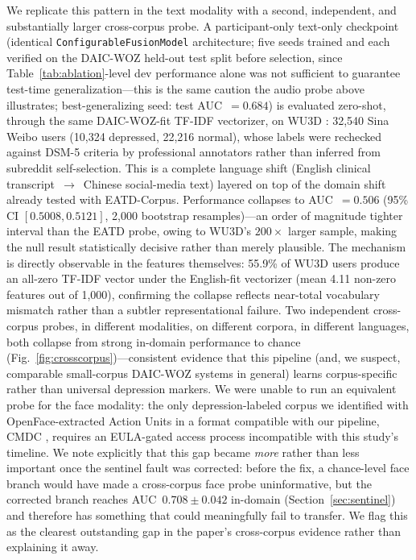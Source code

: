 \documentclass[5p,twocolumn]{elsarticle}
\begin{document}
We replicate this pattern in the text modality with a second,
independent, and substantially larger cross-corpus probe. A
participant-only text-only checkpoint (identical
\texttt{ConfigurableFusionModel} architecture; five seeds trained and
each verified on the DAIC-WOZ held-out test split before selection,
since Table~\ref{tab:ablation}-level dev performance alone was not
sufficient to guarantee test-time generalization---this is the same
caution the audio probe above illustrates; best-generalizing seed:
test AUC~$=0.684$) is evaluated zero-shot, through the same
DAIC-WOZ-fit TF-IDF vectorizer, on WU3D \cite{wang2020wu3d}: 32,540
Sina Weibo users (10,324 depressed, 22,216 normal), whose labels were
rechecked against DSM-5 criteria by professional annotators rather
than inferred from subreddit self-selection. This is a complete
language shift (English clinical transcript~$\to$~Chinese
social-media text) layered on top of the domain shift already tested
with EATD-Corpus. Performance collapses to AUC~$=0.506$ (95\% CI
$[0.5008, 0.5121]$, 2,000 bootstrap resamples)---an order of
magnitude tighter interval than the EATD probe, owing to WU3D's
$200\times$ larger sample, making the null result statistically
decisive rather than merely plausible. The mechanism is directly
observable in the features themselves: 55.9\% of WU3D users produce
an all-zero TF-IDF vector under the English-fit vectorizer (mean 4.11
non-zero features out of 1,000), confirming the collapse reflects
near-total vocabulary mismatch rather than a subtler representational
failure. Two independent cross-corpus probes, in different
modalities, on different corpora, in different languages, both
collapse from strong in-domain performance to chance
(Fig.~\ref{fig:crosscorpus})---consistent
evidence that this pipeline (and, we suspect, comparable
small-corpus DAIC-WOZ systems in general) learns corpus-specific
rather than universal depression markers. We were unable to run an
equivalent probe for the face modality: the only depression-labeled
corpus we identified with OpenFace-extracted Action Units in a format
compatible with our pipeline, CMDC \cite{zou2023cmdc}, requires an
EULA-gated access process incompatible with this study's timeline. We
note explicitly that this gap became \emph{more} rather than less
important once the sentinel fault was corrected: before the fix, a
chance-level face branch would have made a cross-corpus face probe
uninformative, but the corrected branch reaches AUC~$0.708\pm0.042$
in-domain (Section~\ref{sec:sentinel}) and therefore has something that
could meaningfully fail to transfer. We flag this as the clearest
outstanding gap in the paper's cross-corpus evidence rather than
explaining it away.
\end{document}

